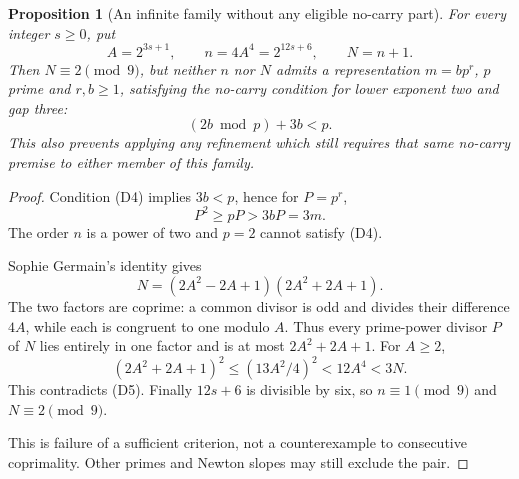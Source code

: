 \documentclass[11pt]{article}
\newtheorem{proposition}[theorem]{Proposition}
\begin{document}
\begin{proposition}[An infinite family without any eligible no-carry part]\label{prop:quintic-no-carry-coverage-failure}
For every integer $s\ge0$, put
\[
 A=2^{3s+1},\qquad n=4A^4=2^{12s+6},\qquad N=n+1.
\]
Then $N\equiv2\pmod9$, but neither $n$ nor $N$ admits a
representation $m=bp^r$, $p$ prime and $r,b\ge1$, satisfying
the no-carry condition for lower exponent two and gap three:
\[
                    (2b\bmod p)+3b<p.                       \tag{D4}
\]
This also prevents applying any refinement which still requires
that same no-carry premise to either member of this family.
\end{proposition}
\begin{proof}
Condition (D4) implies $3b<p$, hence for $P=p^r$,
\[
                    P^2\ge pP>3bP=3m.                     \tag{D5}
\]
The order $n$ is a power of two and $p=2$ cannot satisfy (D4).

Sophie Germain's identity gives
\[
 N=(2A^2-2A+1)(2A^2+2A+1).
\]
The two factors are coprime: a common divisor is odd and
divides their difference $4A$, while each is congruent to one
modulo $A$. Thus every prime-power divisor $P$ of $N$ lies
entirely in one factor and is at most $2A^2+2A+1$.
For $A\ge2$,
\[
 (2A^2+2A+1)^2
 \le(13A^2/4)^2
 <12A^4<3N.
\]
This contradicts (D5). Finally $12s+6$ is divisible by six,
so $n\equiv1\pmod9$ and $N\equiv2\pmod9$.

This is failure of a sufficient criterion, not a counterexample
to consecutive coprimality. Other primes and Newton slopes
may still exclude the pair.
\end{proof}
\end{document}
